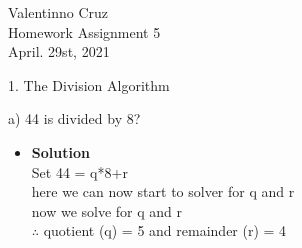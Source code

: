 \documentclass[11pt]{article}
\begin{document}
\begin{center}
    {\Large Valentinno Cruz\\
    Homework Assignment 5\\
    April. 29st, 2021\\}

\end{center}


\begin{flushleft}
{\Large 1. The Division Algorithm}
\end{flushleft}





\begin{flushleft}
{\large \hspace{.5cm}\textbf{1. What are the quotient and remainder when}\\
\end{flushleft}





\begin{enumerate}

\begin{flushleft}
{\large a) 44 is divided by 8?}\\
\end{flushleft}





\begin{itemize}

\item \textbf{Solution}\\
\large Set 44 = q*8+r\\
\large here we can now start to solver for q and r\\
\large now we solve for q and r\\
\large $\therefore$ quotient (q) = 5 and remainder (r) = 4\\



\end {itemize}
\end {enumerate}


\end{document}
